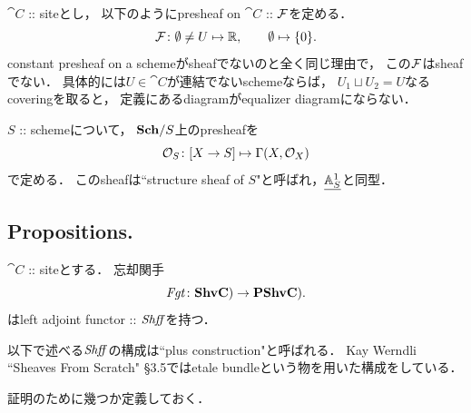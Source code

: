 \begin{Example}
    $\cat{C}$ :: siteとし，
    以下のようにpresheaf on $\cat{C}$ :: $\mathcal{F}$を定める．
    \[ \mathcal{F} \colon \emptyset \neq U \mapsto \mathbb{R}, \qquad \emptyset \mapsto \{0\}.  \]
    constant presheaf on a schemeがsheafでないのと全く同じ理由で，
    この$\mathcal{F}$はsheafでない．
    具体的には$U \in \cat{C}$が連結でないschemeならば，
    $U_1 \sqcup U_2=U$なるcoveringを取ると，
    定義にあるdiagramがequalizer diagramにならない．
\end{Example}

\begin{Example}
    $S$ :: schemeについて，
    $\mathbf{Sch}/S$上のpresheafを
    \[ \mathcal{O}_S \colon [X \to S] \mapsto \Gamma(X, \mathcal{O}_X) \]
    で定める．
    このsheafは``structure sheaf of $S$"と呼ばれ，$\underline{\mathbb{A}^1_S}$と同型．
\end{Example}

\subsection{Propositions.}
\begin{Thm}\label{thm:Shff}
    $\cat{C}$ :: siteとする．
    忘却関手
    \[ \mathit{Fgt} \colon \mathbf{Shv}\mathbf{C}) \to \mathbf{PShv}\mathbf{C}). \]
    はleft adjoint functor :: $\mathit{Shff}$を持つ．
\end{Thm}
\begin{Remark}
    以下で述べる$\mathit{Shff}$の構成は``plus construction"と呼ばれる．
    Kay Werndli ``Sheaves From Scratch" \S3.5ではetale bundleという物を用いた構成をしている．
\end{Remark}

証明のために幾つか定義しておく．

